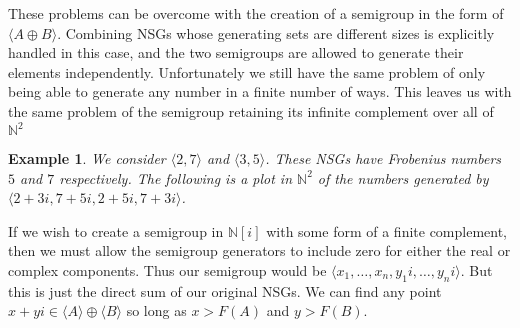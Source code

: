 \documentclass[11pt]{amsart}
\theoremstyle{plain}
\newtheorem{exa}{Example}
\theoremstyle{definition}
\begin{document}
These problems can be overcome with the  creation of a semigroup in the form of $\langle A\oplus B\rangle$. Combining NSGs whose generating sets are different sizes is explicitly handled in this case, and the two semigroups are allowed to generate their elements independently. Unfortunately we still have the same problem of only being able to generate any number in a finite number of ways. This leaves us with the same problem of the semigroup retaining its infinite complement over all of $\mathbb{N}^2$
\begin{exa}
We consider $\langle 2,7\rangle$ and $\langle 3,5\rangle$. These NSGs have Frobenius numbers $5$ and $7$ respectively\cite{frobmask}. The following is a plot in $\mathbb{N}^2$ of the numbers generated by $\langle 2+3i,7+5i,2+5i,7+3i\rangle$.

\begin{center}
\end{center}
\end{exa}
If we wish to create a semigroup in $\mathbb{N}[i]$ with some form of a finite complement, then we must allow the semigroup generators to include zero for either the real or complex components.
Thus our semigroup would be $\langle x_1,\dots,x_n,y_1i,\dots,y_ni\rangle$.
But this is just the direct sum of our original NSGs.
We can find any point $x+yi\in \langle A\rangle\oplus \langle B\rangle$ so long as $x>F(A)$ and $y>F(B)$.
\end{document}
